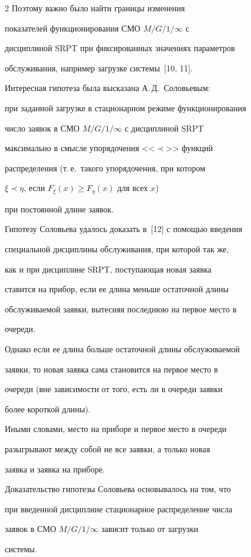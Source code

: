 \begin{multicols}{2}
Поэтому важно было найти грани\-цы изменения


показателей функционирования СМО $M/G/1/\infty$ с


дисциплиной SRPT при фикси\-ро\-ван\-ных значениях параметров


обслуживания, например загрузке системы~[10, 11].





Интересная гипотеза была высказана А.\,Д.~Соловьевым:


при заданной загрузке в стационарном режиме функционирования


число заявок в СМО $M/G/1/\infty$ с дисциплиной SRPT


максимально в смысле упорядочения <<$\prec$>> функций


распределения (т.\,е.\ такого упорядочения, при котором


$\xi\prec\eta$, если $F_\xi(x)\ge F_\eta(x)$ для всех $x$)


при постоянной длине заявок.


Гипотезу Соловьева удалось доказать в~[12] с помощью введения


специальной дисциплины обслуживания, при которой так же,


как и при дисциплине SRPT, поступающая новая заявка


ставится на прибор, если ее длина меньше остаточной длины


обслуживаемой заявки, вытесняя последнюю на первое место в


очереди.


Однако если ее длина больше остаточной длины обслуживаемой


заявки, то новая заявка сама становится на первое место в


очереди (вне зависимости от того, есть ли в очереди заявки


более короткой длины).


Иными словами, место на приборе и первое место в очереди


разыгрывают между собой не все заявки, а только новая


заявка и заявка на приборе.


Доказательство гипотезы Соловьева основывалось на том, что


при введенной дисциплине стационарное распределение числа


заявок в СМО $M/G/1/\infty$ зависит только от загрузки


системы.






\end{multicols}

